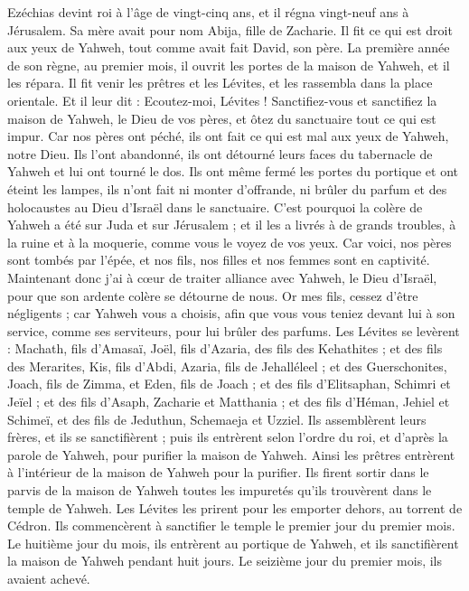 \begin{multicols}{2}
\VerseOne{}Ezéchias devint roi à l'âge de vingt-cinq ans, et il régna vingt-neuf ans à Jérusalem. Sa mère avait pour nom Abija, fille de Zacharie.
Il fit ce qui est droit aux yeux de Yahweh, tout comme avait fait David, son père.
La première année de son règne, au premier mois, il ouvrit les portes de la maison de Yahweh, et il les répara.
Il fit venir les prêtres et les Lévites, et les rassembla dans la place orientale.
Et il leur dit : Ecoutez-moi, Lévites ! Sanctifiez-vous et sanctifiez la maison de Yahweh, le Dieu de vos pères, et ôtez du sanctuaire tout ce qui est impur.
Car nos pères ont péché, ils ont fait ce qui est mal aux yeux de Yahweh, notre Dieu. Ils l'ont abandonné, ils ont détourné leurs faces du tabernacle de Yahweh et lui ont tourné le dos.
Ils ont même fermé les portes du portique et ont éteint les lampes, ils n'ont fait ni monter d'offrande, ni brûler du parfum et des holocaustes au Dieu d'Israël dans le sanctuaire.
C'est pourquoi la colère de Yahweh a été sur Juda et sur Jérusalem ; et il les a livrés à de grands troubles, à la ruine et à la moquerie, comme vous le voyez de vos yeux.
Car voici, nos pères sont tombés par l'épée, et nos fils, nos filles et nos femmes sont en captivité.
Maintenant donc j'ai à cœur de traiter alliance avec Yahweh, le Dieu d'Israël, pour que son ardente colère se détourne de nous.
Or mes fils, cessez d'être négligents ; car Yahweh vous a choisis, afin que vous vous teniez devant lui à son service, comme ses serviteurs, pour lui brûler des parfums.
Les Lévites se levèrent : Machath, fils d'Amasaï, Joël, fils d'Azaria, des fils des Kehathites ; et des fils des Merarites, Kis, fils d'Abdi, Azaria, fils de Jehalléleel ; et des Guerschonites, Joach, fils de Zimma, et Eden, fils de Joach ;
et des fils d'Elitsaphan, Schimri et Jeïel ; et des fils d'Asaph, Zacharie et Matthania ;
et des fils d'Héman, Jehiel et Schimeï, et des fils de Jeduthun, Schemaeja et Uzziel.
Ils assemblèrent leurs frères, et ils se sanctifièrent ; puis ils entrèrent selon l'ordre du roi, et d'après la parole de Yahweh, pour purifier la maison de Yahweh.
Ainsi les prêtres entrèrent à l'intérieur de la maison de Yahweh pour la purifier. Ils firent sortir dans le parvis de la maison de Yahweh toutes les impuretés qu'ils trouvèrent dans le temple de Yahweh. Les Lévites les prirent pour les emporter dehors, au torrent de Cédron.
Ils commencèrent à sanctifier le temple le premier jour du premier mois. Le huitième jour du mois, ils entrèrent au portique de Yahweh, et ils sanctifièrent la maison de Yahweh pendant huit jours. Le seizième jour du premier mois, ils avaient achevé.

\end{multicols}
